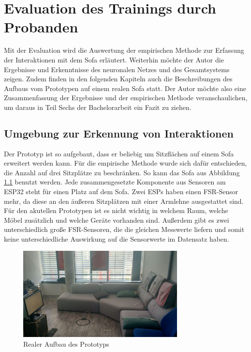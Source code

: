 \chapter{Evaluation des Trainings durch Probanden}
Mit der Evaluation wird die Auswertung der empirischen Methode zur Erfassung der Interaktionen mit dem Sofa erläutert. Weiterhin möchte der Autor die Ergebnisse und Erkenntnisse des neuronalen Netzes und des Gesamtsystems zeigen. Zudem finden in den folgenden Kapiteln auch die Beschreibungen des Aufbaus vom Prototypen auf einem realen Sofa statt. Der Autor möchte also eine Zusammenfassung der Ergebnisse und der empirischen Methode veranschaulichen, um daraus in Teil Sechs der Bachelorarbeit ein Fazit zu ziehen.

\section{Umgebung zur Erkennung von Interaktionen}
\label{sec:er_in}
Der Prototyp ist so aufgebaut, dass er beliebig um Sitzflächen auf einem Sofa erweitert werden kann. Für die empirische Methode wurde sich dafür entschieden, die Anzahl auf drei Sitzplätze zu beschränken. So kann das Sofa aus Abbildung \ref{fig:prot} benutzt werden. Jede zusammengesetzte Komponente aus Sensoren am ESP32 steht für einen Platz auf dem Sofa. Zwei ESPs haben einen FSR-Sensor mehr, da diese an den äußeren Sitzplätzen mit einer Armlehne ausgestattet sind. Für den akutellen Prototypen ist es nicht wichtig in welchem Raum, welche Möbel zusätzlich und welche Geräte vorhanden sind. Außerdem gibt es zwei unterschiedlich große FSR-Sensoren, die die gleichen Messwerte liefern und somit keine unterschiedliche Auswirkung auf die Sensorwerte im Datensatz haben.
\newline
\begin{figure}[H]
	\centering
		\includegraphics[width=0.75\textwidth]{images/prototyp.jpg}
	\caption{Realer Aufbau des Prototyps}
	\label{fig:prot}
\end{figure}

